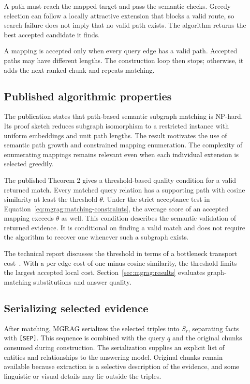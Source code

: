 A path must reach the mapped target and pass the semantic checks. Greedy selection can follow a locally attractive extension that blocks a valid route, so search failure does not imply that no valid path exists. The algorithm returns the best accepted candidate it finds.

A mapping is accepted only when every query edge has a valid path. Accepted paths may have different lengths. The construction loop then stops; otherwise, it adds the next ranked chunk and repeats matching.

\subsection{Published algorithmic properties}

The publication states that path-based semantic subgraph matching is NP-hard. Its proof sketch reduces subgraph isomorphism to a restricted instance with uniform embeddings and unit path lengths. The result motivates the use of semantic path growth and constrained mapping enumeration. The complexity of enumerating mappings remains relevant even when each individual extension is selected greedily.

The published Theorem 2 gives a threshold-based quality condition for a valid returned match. Every matched query relation has a supporting path with cosine similarity at least the threshold $\theta$. Under the strict acceptance test in Equation~\ref{eq:mgrag:matching-constraints}, the average score of an accepted mapping exceeds $\theta$ as well. This condition describes the semantic validation of returned evidence. It is conditional on finding a valid match and does not require the algorithm to recover one whenever such a subgraph exists.

The technical report discusses the threshold in terms of a bottleneck transport cost~\cite{mgrag-tech-report}. With a per-edge cost of one minus cosine similarity, the threshold limits the largest accepted local cost. Section~\ref{sec:mgrag:results} evaluates graph-matching substitutions and answer quality.

\subsection{Serializing selected evidence}

After matching, MGRAG serializes the selected triples into $S_r$, separating facts with \texttt{[SEP]}. This sequence is combined with the query $q$ and the original chunks consumed during construction. The serialization supplies an explicit list of entities and relationships to the answering model. Original chunks remain available because extraction is a selective description of the evidence, and some linguistic or visual details may lie outside the triples.

